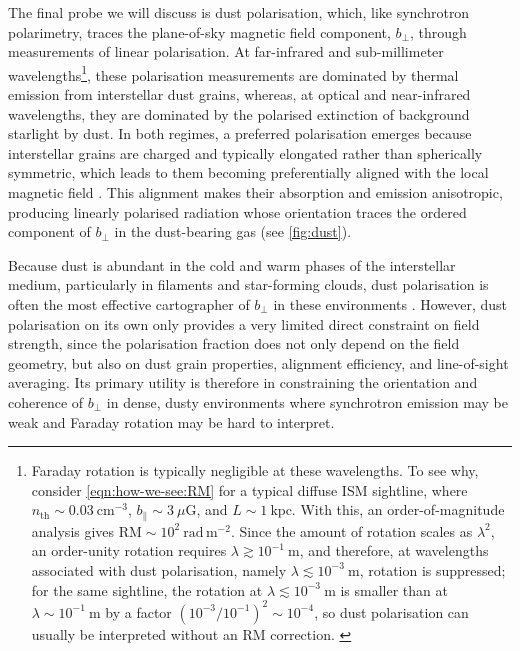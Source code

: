 \documentclass[12pt,twoside]{extreport}
\begin{document}
The final probe we will discuss is dust polarisation, which, like synchrotron polarimetry, traces the plane-of-sky magnetic field component, $b_\perp$, through measurements of linear polarisation. At far-infrared and sub-millimeter wavelengths\footnote{
    Faraday rotation is typically negligible at these wavelengths. To see why, consider \autoref{eqn:how-we-see:RM} for a typical diffuse ISM sightline, where $n_\mathrm{th}\sim 0.03~\mathrm{cm^{-3}}$, $b_\parallel\sim 3~\mu\mathrm{G}$, and $L\sim 1~\mathrm{kpc}$. With this, an order-of-magnitude analysis gives $\mathrm{RM}\sim 10^2~\mathrm{rad\,m^{-2}}$. Since the amount of rotation scales as $\lambda^2$, an order-unity rotation requires $\lambda \gtrsim 10^{-1}~\mathrm{m}$, and therefore, at wavelengths associated with dust polarisation, namely $\lambda \lesssim 10^{-3}~\mathrm{m}$, rotation is suppressed; for the same sightline, the rotation at $\lambda\lesssim 10^{-3}~\mathrm{m}$ is smaller than at $\lambda\sim 10^{-1}~\mathrm{m}$ by a factor $\left(10^{-3}/10^{-1}\right)^2 \sim 10^{-4}$, so dust polarisation can usually be interpreted without an $\mathrm{RM}$ correction.
    \label{fnote:faraday}
}, these polarisation measurements are dominated by thermal emission from interstellar dust grains, whereas, at optical and near-infrared wavelengths, they are dominated by the polarised extinction of background starlight by dust. In both regimes, a preferred polarisation emerges because interstellar grains are charged and typically elongated rather than spherically symmetric, which leads to them becoming preferentially aligned with the local magnetic field \citep{andersson2015interstellar}. This alignment makes their absorption and emission anisotropic, producing linearly polarised radiation whose orientation traces the ordered component of $b_\perp$ in the dust-bearing gas (see \autoref{fig:dust}).

Because dust is abundant in the cold and warm phases of the interstellar medium, particularly in filaments and star-forming clouds, dust polarisation is often the most effective cartographer of $b_\perp$ in these environments \citep{collaboration2015planck}. However, dust polarisation on its own only provides a very limited direct constraint on field strength, since the polarisation fraction does not only depend on the field geometry, but also on dust grain properties, alignment efficiency, and line-of-sight averaging. Its primary utility is therefore in constraining the orientation and coherence of $b_\perp$ in dense, dusty environments where synchrotron emission may be weak and Faraday rotation may be hard to interpret.
\end{document}
